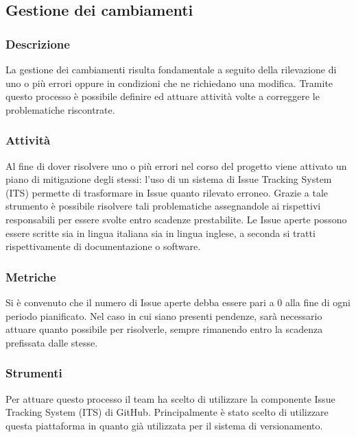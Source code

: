\subsection{Gestione dei cambiamenti}
	
	\subsubsection{Descrizione}
		La gestione dei cambiamenti risulta fondamentale a seguito della rilevazione di uno o più errori oppure in condizioni che ne richiedano una modifica. Tramite questo processo è possibile definire ed attuare attività volte a correggere le problematiche riscontrate.
	
	
	\subsubsection{Attività}
			Al fine di dover risolvere uno o più errori nel corso del progetto viene attivato un piano di mitigazione degli stessi: l'uso di un sistema di Issue Tracking System (ITS) permette di trasformare in Issue quanto rilevato erroneo. Grazie a tale strumento è possibile risolvere tali problematiche assegnandole ai rispettivi responsabili per essere svolte entro scadenze prestabilite. Le Issue aperte possono essere scritte sia in lingua italiana sia in lingua inglese, a seconda si tratti rispettivamente di documentazione o software.
	
	
	\subsubsection{Metriche}
			Si è convenuto che il numero di Issue aperte debba essere pari a 0 alla fine di ogni periodo pianificato. Nel caso in cui siano presenti pendenze, sarà necessario attuare quanto possibile per risolverle, sempre rimanendo entro la scadenza prefissata dalle stesse.
			
			
	\subsubsection{Strumenti}
			Per attuare questo processo il team ha scelto di utilizzare la componente Issue Tracking System (ITS) di GitHub. Principalmente è stato scelto di utilizzare questa piattaforma in quanto già utilizzata per il sistema di versionamento.